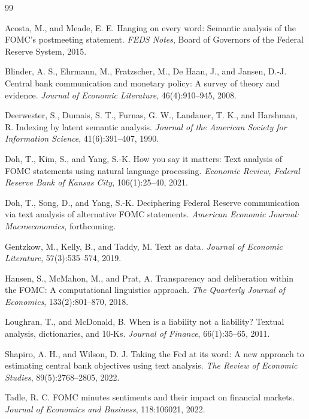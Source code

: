 \documentclass{article}
\begin{document}
\begin{thebibliography}{99}

Acosta, M., and Meade, E. E.
\newblock Hanging on every word: Semantic analysis of the FOMC's postmeeting statement.
\newblock \emph{FEDS Notes}, Board of Governors of the Federal Reserve System, 2015.

Blinder, A. S., Ehrmann, M., Fratzscher, M., De Haan, J., and Jansen, D.-J.
\newblock Central bank communication and monetary policy: A survey of theory and evidence.
\newblock \emph{Journal of Economic Literature}, 46(4):910--945, 2008.

Deerwester, S., Dumais, S. T., Furnas, G. W., Landauer, T. K., and Harshman, R.
\newblock Indexing by latent semantic analysis.
\newblock \emph{Journal of the American Society for Information Science}, 41(6):391--407, 1990.

Doh, T., Kim, S., and Yang, S.-K.
\newblock How you say it matters: Text analysis of FOMC statements using natural language processing.
\newblock \emph{Economic Review, Federal Reserve Bank of Kansas City}, 106(1):25--40, 2021.

Doh, T., Song, D., and Yang, S.-K.
\newblock Deciphering Federal Reserve communication via text analysis of alternative FOMC statements.
\newblock \emph{American Economic Journal: Macroeconomics}, forthcoming.

Gentzkow, M., Kelly, B., and Taddy, M.
\newblock Text as data.
\newblock \emph{Journal of Economic Literature}, 57(3):535--574, 2019.

Hansen, S., McMahon, M., and Prat, A.
\newblock Transparency and deliberation within the FOMC: A computational linguistics approach.
\newblock \emph{The Quarterly Journal of Economics}, 133(2):801--870, 2018.

Loughran, T., and McDonald, B.
\newblock When is a liability not a liability? Textual analysis, dictionaries, and 10-Ks.
\newblock \emph{Journal of Finance}, 66(1):35--65, 2011.

Shapiro, A. H., and Wilson, D. J.
\newblock Taking the Fed at its word: A new approach to estimating central bank objectives using text analysis.
\newblock \emph{The Review of Economic Studies}, 89(5):2768--2805, 2022.

Tadle, R. C.
\newblock FOMC minutes sentiments and their impact on financial markets.
\newblock \emph{Journal of Economics and Business}, 118:106021, 2022.

\end{thebibliography}
\end{document}
